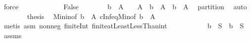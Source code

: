 \begin{isabellebody}
\ force\isanewline
\ \ \ \ \isamarkupfalse%
\isanewline
\ \ \ \ \ \ \isamarkupfalse%
\ False\isanewline
\ \ \ \ \ \ \isamarkupfalse%
\ {\isachardoublequoteopen}{\isacharparenleft}{\kern0pt}{\isacharbraceleft}{\kern0pt}b{\isachardot}{\kern0pt}{\isachardot}{\kern0pt}{\isacharbraceright}{\kern0pt}\ {\isasyminter}\ A{\isacharparenright}{\kern0pt}\ {\isacharequal}{\kern0pt}\ {\isacharparenleft}{\kern0pt}{\isacharbraceleft}{\kern0pt}{}{\isachardot}{\kern0pt}{\isachardot}{\kern0pt}{\isacharbraceright}{\kern0pt}\ {\isasyminter}\ A{\isacharparenright}{\kern0pt}\ {\isasymor}\ {\isacharparenleft}{\kern0pt}{\isacharbraceleft}{\kern0pt}b{\isachardot}{\kern0pt}{\isachardot}{\kern0pt}{\isacharbraceright}{\kern0pt}\ {\isasyminter}\ A{\isacharparenright}{\kern0pt}\ {\isacharequal}{\kern0pt}\ {\isacharparenleft}{\kern0pt}{\isacharbraceleft}{\kern0pt}b{\isachardot}{\kern0pt}{\isachardot}{\kern0pt}{\isacharless}{\kern0pt}{}{\isacharbraceright}{\kern0pt}\ {\isasyminter}\ A{\isacharparenright}{\kern0pt}{\isachardoublequoteclose}\ \isamarkupfalse%
\ partition\ \isamarkupfalse%
\ auto\isanewline
\ \ \ \ \ \ \isamarkupfalse%
\ {\isacharquery}{\kern0pt}thesis\ \isamarkupfalse%
\ Min{\isacharunderscore}{\kern0pt}in{\isacharbrackleft}{\kern0pt}of\ {\isachardoublequoteopen}{\isacharbraceleft}{\kern0pt}b{\isachardot}{\kern0pt}{\isachardot}{\kern0pt}{\isacharbraceright}{\kern0pt}\ {\isasyminter}\ A{\isachardoublequoteclose}{\isacharbrackright}{\kern0pt}\ cInf{\isacharunderscore}{\kern0pt}eq{\isacharunderscore}{\kern0pt}Min{\isacharbrackleft}{\kern0pt}of\ {\isachardoublequoteopen}{\isacharbraceleft}{\kern0pt}b{\isachardot}{\kern0pt}{\isachardot}{\kern0pt}{\isacharbraceright}{\kern0pt}\ {\isasyminter}\ A{\isachardoublequoteclose}{\isacharbrackright}{\kern0pt}\ \isamarkupfalse%
\ {\isacharparenleft}{\kern0pt}metis\ asm\ nonneg\ finite{\isacharunderscore}{\kern0pt}Int\ finite{\isacharunderscore}{\kern0pt}atLeastLessThan{\isacharunderscore}{\kern0pt}int{\isacharparenright}{\kern0pt}\isanewline
\ \ \ \ \isamarkupfalse%
\isanewline
\ \ \isamarkupfalse%
\isanewline
\ \ \isamarkupfalse%
\ b\ \ {\isachardoublequoteopen}S\ {\isacharequal}{\kern0pt}\ {\isacharbraceleft}{\kern0pt}b{\isachardot}{\kern0pt}{\isachardot}{\kern0pt}{\isacharbraceright}{\kern0pt}\ {\isasyminter}\ S{\isachardoublequoteclose}\ \isamarkupfalse%
\ assms\ \isamarkupfalse%

\end{isabellebody}
